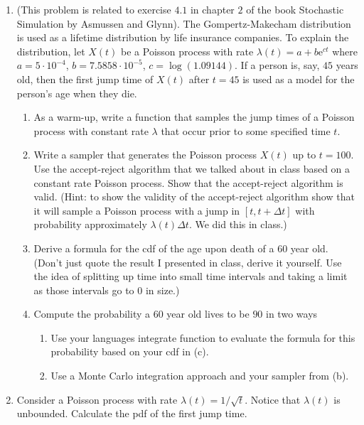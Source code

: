 \documentclass{article}
\begin{document}
\begin{enumerate} 



\item (This problem is related to exercise $4.1$ in chapter $2$ of the book Stochastic Simulation by Asmussen and Glynn).   The Gompertz-Makecham distribution is used as a lifetime distribution by life insurance companies.   To explain the distribution, let $X(t)$ be a Poisson process with rate $\lambda(t) = a + b\text{e}^{ct}$ where $a = 5 \cdot 10^{-4}$, $b=7.5858\cdot 10^{-5}$, $c = \log(1.09144)$.   If a person is, say, $45$ years old, then the first jump time of $X(t)$ after $t=45$ is used as a model for the person's age when they die.   
\begin{enumerate}
\item As a warm-up, write a function that samples the jump times of a Poisson process with constant rate $\lambda$ that occur prior to some specified time $t$.  
\item Write a sampler that generates the Poisson process $X(t)$ up to $t=100$.  Use the accept-reject algorithm that we talked about in class based on a constant rate Poisson process.   Show that the accept-reject algorithm is valid.  (Hint: to show the validity of the accept-reject algorithm show that it will sample a Poisson process with a jump in $[t, t+\Delta t]$ with probability approximately $\lambda(t) \Delta t$.  We did this in class.) 
\item Derive a formula for the cdf of the age upon death of a $60$ year old.   (Don't just quote the result I presented in class, derive it yourself.  Use the idea of splitting up time into small time intervals and taking a limit as those intervals go to $0$ in size.)
\item Compute the probability a $60$ year old lives to be $90$ in two ways
\begin{enumerate}
\item Use your languages integrate function to evaluate the formula for this probability based on your cdf in (c).
\item Use a Monte Carlo integration approach and your sampler from (b).
\end{enumerate}
\end{enumerate}


\item Consider a Poisson process with rate $\lambda(t) = 1/\sqrt{t}$.  Notice that $\lambda(t)$ is unbounded.
Calculate the pdf of the first jump time.


\end{enumerate}
\end{document}
